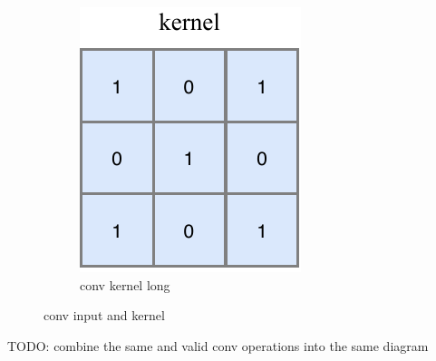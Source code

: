 \begin{figure}
\begin{subfigure}[b]{0.3\textwidth}
        \includegraphics[width=\textwidth]{diagrams/7-cvn/conv_kernel.pdf}
        \caption{conv kernel long}
        \label{fig:conv_kernel}
    \end{subfigure}
    \caption{conv input and kernel}
    \label{fig:conv_input_kernel}
\end{figure}

TODO: combine the same and valid conv operations into the same diagram

